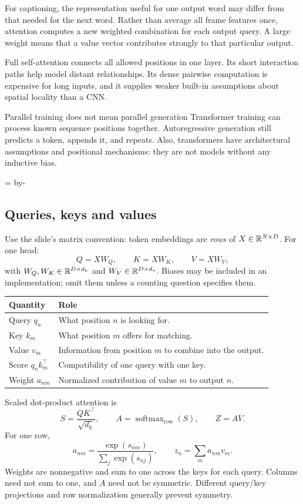 \documentclass[11pt]{article}
\newcommand{\newsubsection}[1]{\par\begingroup\skip0=\pagegoal\advance\skip0 by-\pagetotal\ifdim\skip0<12\baselineskip\newpage\fi\endgroup\subsection{#1}}
\begin{document}
For captioning, the representation useful for one output word may differ from that needed for the next word. Rather than average all frame features once, attention computes a new weighted combination for each output query. A large weight means that a value vector contributes strongly to that particular output.

Full self-attention connects all allowed positions in one layer. Its short interaction paths help model distant relationships. Its dense pairwise computation is expensive for long inputs, and it supplies weaker built-in assumptions about spatial locality than a CNN.
\begin{careful}{Parallel training does not mean parallel generation}
Transformer training can process known sequence positions together. Autoregressive generation still predicts a token, appends it, and repeats. Also, transformers have architectural assumptions and positional mechanisms: they are not models without any inductive bias.
\end{careful}

\newsubsection{Queries, keys and values}
Use the slide's matrix convention: token embeddings are \emph{rows} of $X\in\mathbb{R}^{N\times D}$. For one head:
\[
Q=XW_Q,\qquad K=XW_K,\qquad V=XW_V,
\]
with $W_Q,W_K\in\mathbb{R}^{D\times d_k}$ and $W_V\in\mathbb{R}^{D\times d_v}$. Biases may be included in an implementation; omit them unless a counting question specifies them.

\begin{longtable}{@{}P{.20\textwidth}P{.70\textwidth}@{}}
\toprule Quantity & Role\\\midrule\endhead
Query $q_n$ & What position $n$ is looking for.\\
Key $k_m$ & What position $m$ offers for matching.\\
Value $v_m$ & Information from position $m$ to combine into the output.\\
Score $q_nk_m^\top$ & Compatibility of one query with one key.\\
Weight $a_{nm}$ & Normalized contribution of value $m$ to output $n$.\\\bottomrule
\end{longtable}
Scaled dot-product attention is
\[
S=\frac{QK^\top}{\sqrt{d_k}},\qquad
A=\operatorname{softmax}_{\mathrm{row}}(S),\qquad Z=AV.
\]
For one row,
\[
a_{nm}=\frac{\exp(s_{nm})}{\sum_j\exp(s_{nj})},\qquad
z_n=\sum_m a_{nm}v_m.
\]
Weights are nonnegative and sum to one across the keys for each query. Columns need not sum to one, and $A$ need not be symmetric. Different query/key projections and row normalization generally prevent symmetry.
\end{document}
